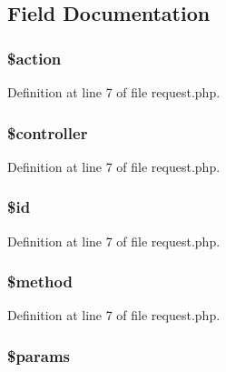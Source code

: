 \subsection{\-Field \-Documentation}
\hypertarget{class_request_aa698a3e72116e8e778be0e95d908ee30}{
\subsubsection[{\$action}]{\setlength{\rightskip}{0pt plus 5cm}\$action}}\label{class_request_aa698a3e72116e8e778be0e95d908ee30}


\-Definition at line 7 of file request.\-php.

\hypertarget{class_request_a388ef7b1db5e6f728e63cee704ce6e23}{
\subsubsection[{\$controller}]{\setlength{\rightskip}{0pt plus 5cm}\$controller}}\label{class_request_a388ef7b1db5e6f728e63cee704ce6e23}


\-Definition at line 7 of file request.\-php.

\hypertarget{class_request_ae97941710d863131c700f069b109991e}{
\subsubsection[{\$id}]{\setlength{\rightskip}{0pt plus 5cm}\$id}}\label{class_request_ae97941710d863131c700f069b109991e}


\-Definition at line 7 of file request.\-php.

\hypertarget{class_request_a12661b2fc0f57f97e30a1620889ce9c6}{
\subsubsection[{\$method}]{\setlength{\rightskip}{0pt plus 5cm}\$method}}\label{class_request_a12661b2fc0f57f97e30a1620889ce9c6}


\-Definition at line 7 of file request.\-php.

\hypertarget{class_request_afe68e6fbe7acfbffc0af0c84a1996466}{
\subsubsection[{\$params}]{\setlength{\rightskip}{0pt plus 5cm}\$params}}\label{class_request_afe68e6fbe7acfbffc0af0c84a1996466}


